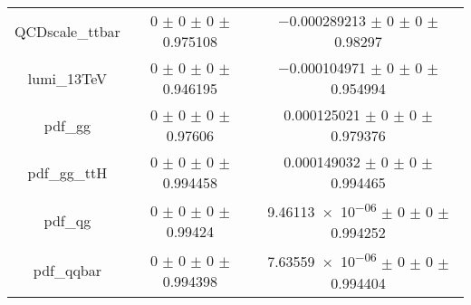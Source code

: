 \begin{table}
\begin{tabular}{ccc}
QCDscale\_ttbar & \num{0} $\pm$ \num{0} $\pm$ \num{0} $\pm$ \num{0.975108} & \num{-0.000289213} $\pm$ \num{0} $\pm$ \num{0} $\pm$ \num{0.98297}\\
lumi\_13TeV & \num{0} $\pm$ \num{0} $\pm$ \num{0} $\pm$ \num{0.946195} & \num{-0.000104971} $\pm$ \num{0} $\pm$ \num{0} $\pm$ \num{0.954994}\\
pdf\_gg & \num{0} $\pm$ \num{0} $\pm$ \num{0} $\pm$ \num{0.97606} & \num{0.000125021} $\pm$ \num{0} $\pm$ \num{0} $\pm$ \num{0.979376}\\
pdf\_gg\_ttH & \num{0} $\pm$ \num{0} $\pm$ \num{0} $\pm$ \num{0.994458} & \num{0.000149032} $\pm$ \num{0} $\pm$ \num{0} $\pm$ \num{0.994465}\\
pdf\_qg & \num{0} $\pm$ \num{0} $\pm$ \num{0} $\pm$ \num{0.99424} & \num{9.46113e-06} $\pm$ \num{0} $\pm$ \num{0} $\pm$ \num{0.994252}\\
pdf\_qqbar & \num{0} $\pm$ \num{0} $\pm$ \num{0} $\pm$ \num{0.994398} & \num{7.63559e-06} $\pm$ \num{0} $\pm$ \num{0} $\pm$ \num{0.994404}\\
\bottomrule
\end{tabular}
\end{table}
